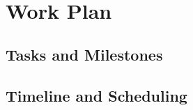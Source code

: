 
%
\   
\chapter{Work Plan}
\label{cha:work_plan}

\glsresetall

\section{Tasks and Milestones}
\label{sec:tasks_milestones}

\section{Timeline and Scheduling}
\label{sec:timeline_scheduling}
